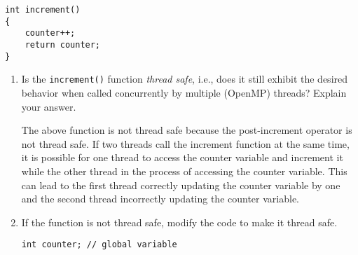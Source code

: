 \documentclass{article}
\begin{document}
\begin{enumerate}
\begin{lstlisting}[style=C]
int increment()
{
    counter++;
    return counter;
}
    \end{lstlisting}
    \begin{enumerate}
        \item Is the \verb|increment()| function \textit{thread safe}, i.e., does it still exhibit the desired behavior when called concurrently by multiple (OpenMP) threads?
        Explain your answer.
        \par 
        The above function is not thread safe because the post-increment operator is not thread safe.
        If two threads call the increment function at the same time, it is possible for one thread to access the counter variable and increment it while the other thread in the process of accessing the counter variable.
        This can lead to the first thread correctly updating the counter variable by one and the second thread incorrectly updating the counter variable.
        \item If the function is not thread safe, modify the code to make it thread safe.
\begin{lstlisting}[style=C]
int counter; // global variable


\end{lstlisting}
\end{enumerate}
\end{enumerate}
\end{document}
